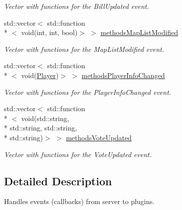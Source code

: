 \begin{DoxyCompactItemize}
\begin{DoxyCompactList}\small\item\em Vector with functions for the Bill\-Updated event. \end{DoxyCompactList}\item 
\hypertarget{classEventManager_a9de43e00de48971bd1299a1d77b7b649}{std\-::vector$<$ std\-::function\\*
$<$ void(int, int, bool)$>$ $>$ \hyperlink{classEventManager_a9de43e00de48971bd1299a1d77b7b649}{methods\-Map\-List\-Modified}}\label{classEventManager_a9de43e00de48971bd1299a1d77b7b649}

\begin{DoxyCompactList}\small\item\em Vector with functions for the Map\-List\-Modified event. \end{DoxyCompactList}\item 
\hypertarget{classEventManager_a390528d8f1a0f9afc6883b0633905254}{std\-::vector$<$ std\-::function\\*
$<$ void(\hyperlink{structPlayer}{Player})$>$ $>$ \hyperlink{classEventManager_a390528d8f1a0f9afc6883b0633905254}{methods\-Player\-Info\-Changed}}\label{classEventManager_a390528d8f1a0f9afc6883b0633905254}

\begin{DoxyCompactList}\small\item\em Vector with functions for the Player\-Info\-Changed event. \end{DoxyCompactList}\item 
\hypertarget{classEventManager_a0b441376e3947a06b84efdc722529ed9}{std\-::vector$<$ std\-::function\\*
$<$ void(std\-::string, \\*
std\-::string, std\-::string, \\*
std\-::string)$>$ $>$ \hyperlink{classEventManager_a0b441376e3947a06b84efdc722529ed9}{methods\-Vote\-Updated}}\label{classEventManager_a0b441376e3947a06b84efdc722529ed9}

\begin{DoxyCompactList}\small\item\em Vector with functions for the Vote\-Updated event. \end{DoxyCompactList}\end{DoxyCompactItemize}


\subsection{Detailed Description}
Handles events (callbacks) from server to plugins. 

